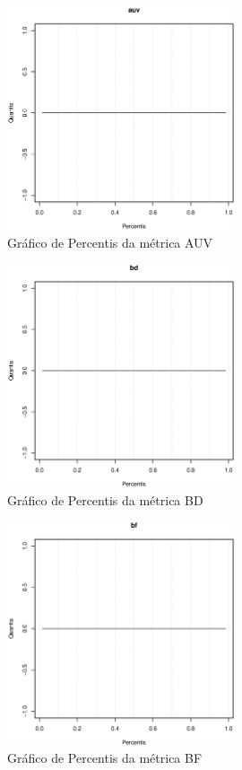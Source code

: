 \begin{anexosenv}
\begin{figure}[h]
  \centering
  \includegraphics[width=0.6\textwidth]
      {dados/linux/auv.eps}
  \caption{Gráfico de Percentis da métrica AUV}
\end{figure}

\newpage

\begin{figure}[h]
  \centering
  \includegraphics[width=0.6\textwidth]
      {dados/linux/bd.eps}
  \caption{Gráfico de Percentis da métrica BD}
\end{figure}

\begin{figure}[h]
  \centering
  \includegraphics[width=0.6\textwidth]
      {dados/linux/bf.eps}
  \caption{Gráfico de Percentis da métrica BF}
\end{figure}


\end{anexosenv}
